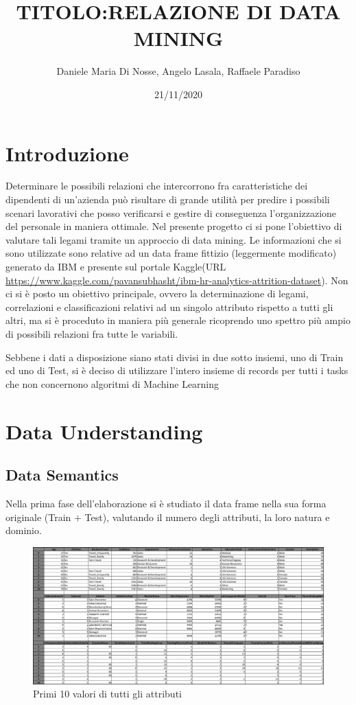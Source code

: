 \documentclass[english]{article}
\begin{document}
\title{TITOLO:RELAZIONE DI DATA MINING}
\author{Daniele Maria Di Nosse, Angelo Lasala, Raffaele Paradiso}
\date{21/11/2020\newpage}

\maketitle
\tableofcontents{}

\newpage

\section{Introduzione}
Determinare le possibili relazioni che intercorrono fra caratteristiche dei dipendenti di un'azienda può risultare di grande utilità per predire i possibili scenari lavorativi che posso verificarsi e gestire di conseguenza l'organizzazione del personale in maniera ottimale. Nel presente progetto ci si pone l'obiettivo di valutare tali legami tramite un approccio di data mining. Le informazioni che si sono utilizzate sono relative ad un data frame fittizio (leggermente modificato) generato da IBM e presente sul portale Kaggle(URL \url{https://www.kaggle.com/pavansubhasht/ibm-hr-analytics-attrition-dataset}). Non ci si è posto un obiettivo principale, ovvero la determinazione di legami, correlazioni e classificazioni relativi ad un singolo attributo rispetto a tutti gli altri, ma si è proceduto in maniera più generale ricoprendo uno spettro più ampio di possibili relazioni fra tutte le variabili.

Sebbene i dati a disposizione siano stati divisi in due sotto insiemi, uno di Train ed uno di Test, si è deciso di utilizzare l'intero insieme di records per tutti i tasks che non concernono algoritmi di Machine Learning
\section{Data Understanding}
\subsection{Data Semantics}
Nella prima fase dell'elaborazione si è studiato il data frame nella sua forma originale (Train $+$ Test), valutando il numero degli attributi, la loro natura e dominio. 

\begin{figure}[H]
\centering
\includegraphics[scale=0.55]{DFhead(10).png}
\caption{Primi 10 valori di tutti gli attributi}
\end{figure}
\end{document}
